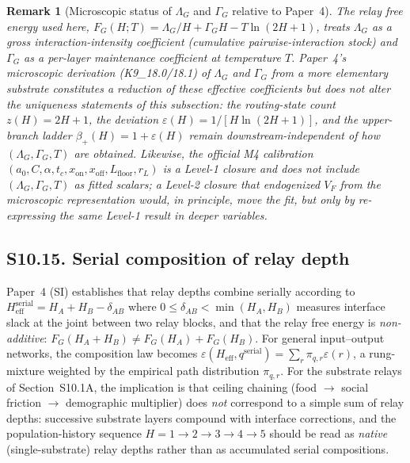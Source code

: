 \documentclass[11pt]{article}
\newtheorem{remark}{Remark}
\begin{document}
\begin{remark}[Microscopic status of $\Lambda_G$ and $\Gamma_G$ relative to Paper~4]
\label{rem:S10_14_LambdaG_micro}
The relay free energy used here, $F_G(H;T)=\Lambda_G/H+\Gamma_G H-T\ln(2H+1)$, treats $\Lambda_G$ as a gross interaction-intensity coefficient (cumulative pairwise-interaction stock) and $\Gamma_G$ as a per-layer maintenance coefficient at temperature $T$.  Paper~4's microscopic derivation (K9\_18.0/18.1) of $\Lambda_G$ and $\Gamma_G$ from a more elementary substrate constitutes a reduction of these effective coefficients but does not alter the uniqueness statements of this subsection: the routing-state count $z(H)=2H+1$, the deviation $\varepsilon(H)=1/[H\ln(2H+1)]$, and the upper-branch ladder $\beta_+(H)=1+\varepsilon(H)$ remain downstream-independent of how $(\Lambda_G,\Gamma_G,T)$ are obtained.  Likewise, the official M4 calibration $(a_0,C,\alpha,t_c,x_{\mathrm{on}},x_{\mathrm{off}},L_{\mathrm{floor}},r_L)$ is a Level-1 closure and does not include $(\Lambda_G,\Gamma_G,T)$ as fitted scalars; a Level-2 closure that endogenized $V_F$ from the microscopic representation would, in principle, move the fit, but only by re-expressing the same Level-1 result in deeper variables.
\end{remark}

\subsection*{S10.15. Serial composition of relay depth}
\label{subsec:S10_15_serial_composition}
Paper~4 (SI) establishes that relay depths combine serially according to
$H^{\mathrm{serial}}_{\mathrm{eff}}=H_A+H_B-\delta_{AB}$ where $0\le\delta_{AB}<\min(H_A,H_B)$
measures interface slack at the joint between two relay blocks, and that the
relay free energy is \emph{non-additive}: $F_G(H_A+H_B)\ne F_G(H_A)+F_G(H_B)$.
For general input--output networks, the composition law becomes
$\varepsilon(H_{\mathrm{eff}},q^{\mathrm{serial}})=\sum_r\pi_{q,r}\varepsilon(r)$, a rung-mixture
weighted by the empirical path distribution $\pi_{q,r}$.  For the substrate relays
of Section~S10.1A, the implication is that ceiling chaining (food $\to$ social friction
$\to$ demographic multiplier) does \emph{not} correspond to a simple sum of relay depths:
successive substrate layers compound with interface corrections, and the population-history
sequence $H{=}1\to 2\to 3\to 4\to 5$ should be read as \emph{native} (single-substrate)
relay depths rather than as accumulated serial compositions.
\end{document}
